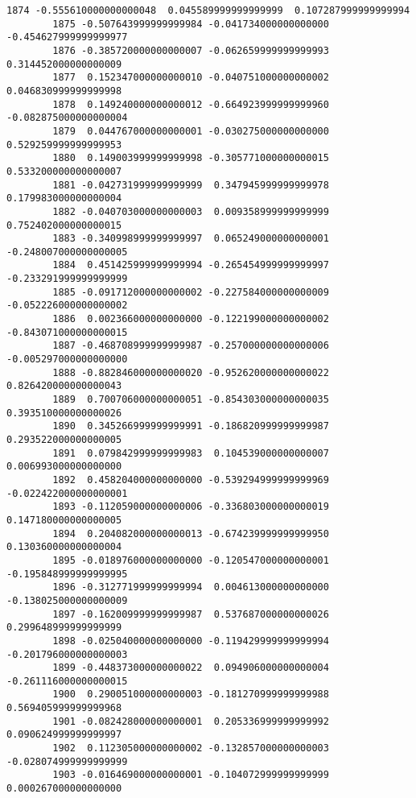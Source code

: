 \documentclass[11pt]{article}
\begin{document}
\begin{Verbatim}[commandchars=\\\{\}]
        1874 -0.555610000000000048  0.045589999999999999  0.107287999999999994   
        1875 -0.507643999999999984 -0.041734000000000000 -0.454627999999999977   
        1876 -0.385720000000000007 -0.062659999999999993  0.314452000000000009   
        1877  0.152347000000000010 -0.040751000000000002  0.046830999999999998   
        1878  0.149240000000000012 -0.664923999999999960 -0.082875000000000004   
        1879  0.044767000000000001 -0.030275000000000000  0.529259999999999953   
        1880  0.149003999999999998 -0.305771000000000015  0.533200000000000007   
        1881 -0.042731999999999999  0.347945999999999978  0.179983000000000004   
        1882 -0.040703000000000003  0.009358999999999999  0.752402000000000015   
        1883 -0.340998999999999997  0.065249000000000001 -0.248007000000000005   
        1884  0.451425999999999994 -0.265454999999999997 -0.233291999999999999   
        1885 -0.091712000000000002 -0.227584000000000009 -0.052226000000000002   
        1886  0.002366000000000000 -0.122199000000000002 -0.843071000000000015   
        1887 -0.468708999999999987 -0.257000000000000006 -0.005297000000000000   
        1888 -0.882846000000000020 -0.952620000000000022  0.826420000000000043   
        1889  0.700706000000000051 -0.854303000000000035  0.393510000000000026   
        1890  0.345266999999999991 -0.186820999999999987  0.293522000000000005   
        1891  0.079842999999999983  0.104539000000000007  0.006993000000000000   
        1892  0.458204000000000000 -0.539294999999999969 -0.022422000000000001   
        1893 -0.112059000000000006 -0.336803000000000019  0.147180000000000005   
        1894  0.204082000000000013 -0.674239999999999950  0.130360000000000004   
        1895 -0.018976000000000000 -0.120547000000000001 -0.195848999999999995   
        1896 -0.312771999999999994  0.004613000000000000 -0.138025000000000009   
        1897 -0.162009999999999987  0.537687000000000026  0.299648999999999999   
        1898 -0.025040000000000000 -0.119429999999999994 -0.201796000000000003   
        1899 -0.448373000000000022  0.094906000000000004 -0.261116000000000015   
        1900  0.290051000000000003 -0.181270999999999988  0.569405999999999968   
        1901 -0.082428000000000001  0.205336999999999992  0.090624999999999997   
        1902  0.112305000000000002 -0.132857000000000003 -0.028074999999999999   
        1903 -0.016469000000000001 -0.104072999999999999  0.000267000000000000   
        

\end{Verbatim}
\end{document}
